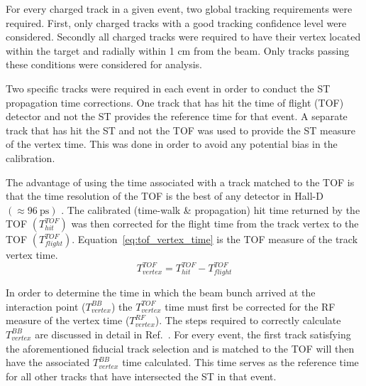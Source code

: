 For every charged track in a given event, two global tracking requirements were required.  First, only charged tracks with a good tracking confidence level were considered.  Secondly all charged tracks were required to have their vertex located within the target and radially within 1 cm from the beam. Only tracks passing these conditions were considered for analysis.

Two specific tracks were required in each event in order to conduct the ST propagation time corrections.  One track that has hit the time of flight (TOF) detector and not the ST provides the reference time for that event.  A separate track that has hit the ST and not the TOF was used to provide the ST measure of the vertex time.  This was done in order to avoid any potential bias in the calibration.  
	

The advantage of using the time associated with a track matched to the TOF is that the time resolution of the TOF is the best of any detector in Hall-D $(\approx 96\ \mathrm{ps})$ \cite{zihlmann_tof}. The calibrated (time-walk \& propagation) hit time returned by the TOF $(T^{TOF}_{hit})$ was then corrected for the flight time from the track vertex to the TOF $(T^{TOF}_{flight})$.  Equation~\ref{eq:tof_vertex_time} is the TOF measure of the track vertex time.
	\begin{equation} \label{eq:tof_vertex_time}
		T^{TOF}_{vertex} = T^{TOF}_{hit} - T^{TOF}_{flight}
	\end{equation}

In order to determine the time in which the beam bunch arrived at the interaction point ($T^{BB}_{vertex}$) the $T^{TOF}_{vertex}$ time must first be corrected for the RF measure of the vertex time ($T^{RF}_{vertex}$).  The steps required to correctly calculate $T^{BB}_{vertex}$ are discussed in detail in Ref.~\cite{pooser16}.  For every event, the first track satisfying the aforementioned fiducial track selection and is matched to the TOF will then have the associated $T^{BB}_{vertex}$ time calculated.  This time serves as the reference time for all other tracks that have intersected the ST in that event.


